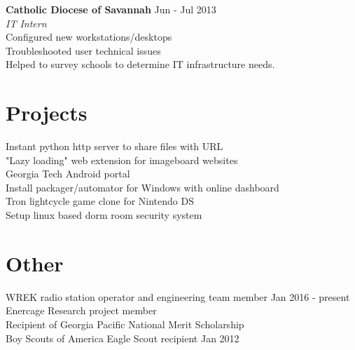 \documentclass[line, margin]{res}
\begin{document}
\begin{resume}
\textbf{Catholic Diocese of Savannah} \hfill Jun - Jul 2013 \\
\textit{IT Intern} \\
Configured new workstations/desktops \\
Troubleshooted user technical issues \\
Helped to survey schools to determine IT infrastructure needs.

\section{Projects}
Instant python http server to share files with URL\\
"Lazy loading" web extension for imageboard websites \\
Georgia Tech Android portal \\
Install packager/automator for Windows with online dashboard\\
Tron lightcycle game clone for Nintendo DS \\
Setup linux based dorm room security system 


\section{Other}
WREK radio station operator and engineering team member \hfill Jan 2016 - present \\
Enercage Research project member\\
Recipient of Georgia Pacific National Merit Scholarship \\
Boy Scouts of America Eagle Scout recipient \hfill Jan 2012 \\

\end{resume}
\end{document}
